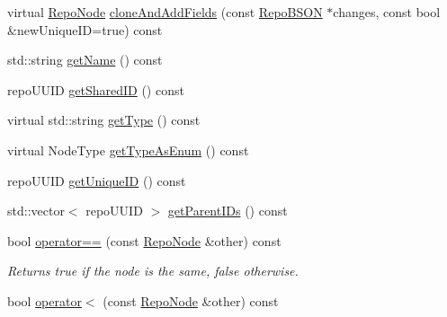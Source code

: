 \begin{DoxyCompactItemize}
\item 
virtual \hyperlink{classrepo_1_1core_1_1model_1_1_repo_node}{Repo\+Node} \hyperlink{classrepo_1_1core_1_1model_1_1_repo_node_aed3611c21562e98e2a0d5d715548f496}{clone\+And\+Add\+Fields} (const \hyperlink{classrepo_1_1core_1_1model_1_1_repo_b_s_o_n}{Repo\+B\+S\+O\+N} $\ast$changes, const bool \&new\+Unique\+I\+D=true) const 
\item 
std\+::string \hyperlink{classrepo_1_1core_1_1model_1_1_repo_node_a001c5d809e79efaab4d4949fe466a619}{get\+Name} () const 
\item 
repo\+U\+U\+I\+D \hyperlink{classrepo_1_1core_1_1model_1_1_repo_node_a3d596341d346f03b7a7716ff629b7ce1}{get\+Shared\+I\+D} () const 
\item 
virtual std\+::string \hyperlink{classrepo_1_1core_1_1model_1_1_repo_node_a4380ba349235b5d9b13b41e41975805e}{get\+Type} () const 
\item 
virtual Node\+Type \hyperlink{classrepo_1_1core_1_1model_1_1_repo_node_ad8d5295248dc9beb0b91efb2ce3b61f4}{get\+Type\+As\+Enum} () const 
\item 
repo\+U\+U\+I\+D \hyperlink{classrepo_1_1core_1_1model_1_1_repo_node_aa8a31489284049610e5f472c88a387bd}{get\+Unique\+I\+D} () const 
\item 
std\+::vector$<$ repo\+U\+U\+I\+D $>$ \hyperlink{classrepo_1_1core_1_1model_1_1_repo_node_a20e3664bab40526d592805d910358f09}{get\+Parent\+I\+Ds} () const 
\item 
\hypertarget{classrepo_1_1core_1_1model_1_1_repo_node_aad580ff0ae7dabaef420e52122bf73d6}{}bool \hyperlink{classrepo_1_1core_1_1model_1_1_repo_node_aad580ff0ae7dabaef420e52122bf73d6}{operator==} (const \hyperlink{classrepo_1_1core_1_1model_1_1_repo_node}{Repo\+Node} \&other) const \label{classrepo_1_1core_1_1model_1_1_repo_node_aad580ff0ae7dabaef420e52122bf73d6}

\begin{DoxyCompactList}\small\item\em Returns true if the node is the same, false otherwise. \end{DoxyCompactList}\item 
\hypertarget{classrepo_1_1core_1_1model_1_1_repo_node_a48d57aecd2edd37df9898b75eeda9ca9}{}bool \hyperlink{classrepo_1_1core_1_1model_1_1_repo_node_a48d57aecd2edd37df9898b75eeda9ca9}{operator$<$} (const \hyperlink{classrepo_1_1core_1_1model_1_1_repo_node}{Repo\+Node} \&other) const \label{classrepo_1_1core_1_1model_1_1_repo_node_a48d57aecd2edd37df9898b75eeda9ca9}


\end{DoxyCompactItemize}
